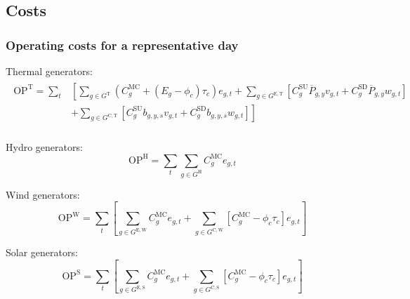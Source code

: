 \documentclass{article}
\newcommand{\sGeneratorsExistingThermal}{G^{\mathrm{E,T}}}
\newcommand{\sGeneratorsExistingWind}{G^{\mathrm{E,W}}}
\newcommand{\sGeneratorsExistingSolar}{G^{\mathrm{E,S}}}
\newcommand{\sGeneratorsCandidateThermal}{G^{\mathrm{C,T}}}
\newcommand{\sGeneratorsCandidateWind}{G^{\mathrm{C,W}}}
\newcommand{\sGeneratorsCandidateSolar}{G^{\mathrm{C,S}}}
\newcommand{\sGeneratorsThermal}{G^{\mathrm{T}}}
\newcommand{\sGeneratorsHydro}{G^{\mathrm{H}}}
\newcommand{\iGenerator}{g}
\newcommand{\iYear}{y}
\newcommand{\iScenario}{s}
\newcommand{\iInterval}{t}
\newcommand{\iCalibrationInterval}{c}
\newcommand{\cOperatingCostThermal}[1][]{\mathrm{OP}^{\mathrm{T}}_{#1}}
\newcommand{\cOperatingCostHydro}[1][]{\mathrm{OP}^{\mathrm{H}}_{#1}}
\newcommand{\cOperatingCostWind}[1][]{\mathrm{OP}^{\mathrm{W}}_{#1}}
\newcommand{\cOperatingCostSolar}[1][]{\mathrm{OP}^{\mathrm{S}}_{#1}}
\newcommand{\cMarginalCost}[1][\iGenerator]{C^{\mathrm{MC}}_{#1}}
\newcommand{\cStartupCost}[1][\iGenerator]{C^{\mathrm{SU}}_{#1}}
\newcommand{\cShutdownCost}[1][\iGenerator]{C^{\mathrm{SD}}_{#1}}
\newcommand{\cEmissionsIntensity}[1][\iGenerator]{E_{#1}}
\newcommand{\cPowerOutputMax}[1][\iGenerator,\iYear]{\overline{P}_{#1}}
\newcommand{\vBaseline}[1][\iCalibrationInterval]{\phi_{#1}}
\newcommand{\vPermitPrice}[1][\iCalibrationInterval]{\tau_{#1}}
\newcommand{\vEnergy}[1][\iGenerator,\iInterval]{e_{#1}}
\newcommand{\vStartupIndicator}[1][\iGenerator,\iInterval]{v_{#1}}
\newcommand{\vShutdownIndicator}[1][\iGenerator,\iInterval]{w_{#1}}
\newcommand{\vInstalledCapacityTotalScenario}[1][\iGenerator,\iYear,\iScenario]{b_{#1}}
\begin{document}
\subsection{Costs}
\subsubsection{Operating costs for a representative day}
Thermal generators:
\begin{align}
\begin{split}
\cOperatingCostThermal = \sum\limits_{\iInterval} & \left[\sum\limits_{\iGenerator \in \sGeneratorsThermal} (\cMarginalCost + (\cEmissionsIntensity - \vBaseline)\vPermitPrice)\vEnergy + \sum\limits_{\iGenerator \in \sGeneratorsExistingThermal} \left[\cStartupCost \cPowerOutputMax \vStartupIndicator + \cShutdownCost \cPowerOutputMax \vShutdownIndicator\right] \right.\\
& \left. + \sum\limits_{\iGenerator \in \sGeneratorsCandidateThermal} \left[\cStartupCost \vInstalledCapacityTotalScenario \vStartupIndicator + \cShutdownCost \vInstalledCapacityTotalScenario \vShutdownIndicator\right] \right]\\
\end{split}
\label{eqn: total thermal generator operating cost}
\end{align}

Hydro generators:
\begin{equation}
\cOperatingCostHydro = \sum\limits_{\iInterval}\sum\limits_{\iGenerator \in \sGeneratorsHydro}\cMarginalCost[\iGenerator] \vEnergy
\end{equation}

Wind generators:
\begin{equation}
\cOperatingCostWind = \sum\limits_{\iInterval}\left[\sum\limits_{\iGenerator \in \sGeneratorsExistingWind} \cMarginalCost[\iGenerator] \vEnergy + \sum\limits_{\iGenerator \in \sGeneratorsCandidateWind} \left[\cMarginalCost[\iGenerator] - \vBaseline \vPermitPrice\right] \vEnergy\right]
\end{equation}

Solar generators:
\begin{equation}
\cOperatingCostSolar = \sum\limits_{\iInterval}\left[\sum\limits_{\iGenerator \in \sGeneratorsExistingSolar} \cMarginalCost[\iGenerator] \vEnergy + \sum\limits_{\iGenerator \in \sGeneratorsCandidateSolar} \left[\cMarginalCost[\iGenerator] - \vBaseline\vPermitPrice\right] \vEnergy\right]
\end{equation}
\end{document}
